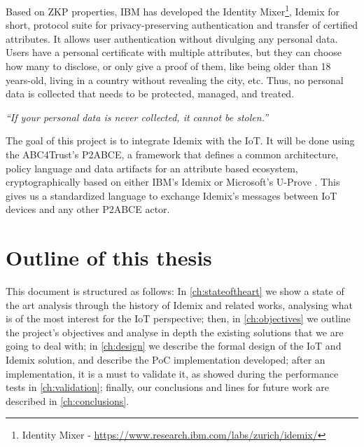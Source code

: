 Based on ZKP properties, IBM has developed the Identity Mixer\footnote{Identity Mixer - \url{https://www.research.ibm.com/labs/zurich/idemix/}}, Idemix for short, protocol suite for privacy-preserving authentication and transfer of certified attributes. It allows user authentication without divulging any personal data. Users have a personal certificate with multiple attributes, but they can choose how many to disclose, or only give a proof of them, like being older than 18 years-old, living in a country without revealing the city, etc. Thus, no personal data is collected that needs to be protected, managed, and treated.

\begin{center}
	\textit{``If your personal data is never collected, it cannot be stolen.''}
\end{center}

The goal of this project is to integrate Idemix with the IoT. It will be done using the ABC4Trust's \ac{P2ABCE}, a framework that defines a common architecture, policy language and data artifacts for an attribute based ecosystem, cryptographically based on either IBM's Idemix or Microsoft's U-Prove \citep{p2abcurl}. This gives us a standardized language to exchange Idemix's messages between IoT devices and any other P2ABCE actor.

\hfil


\section{Outline of this thesis}

This document is structured as follows: In \autoref{ch:stateoftheart} we show a state of the art analysis through the history of Idemix and related works, analysing what is of the most interest for the IoT perspective; then, in \autoref{ch:objectives} we outline the project's objectives and analyse in depth the existing solutions that we are going to deal with; in \autoref{ch:design} we describe the formal design of the IoT and Idemix solution, and describe the PoC implementation developed; after an implementation, it is a must to validate it, as showed during the performance tests in \autoref{ch:validation}; finally, our conclusions and lines for future work are described in \autoref{ch:conclusions}.

